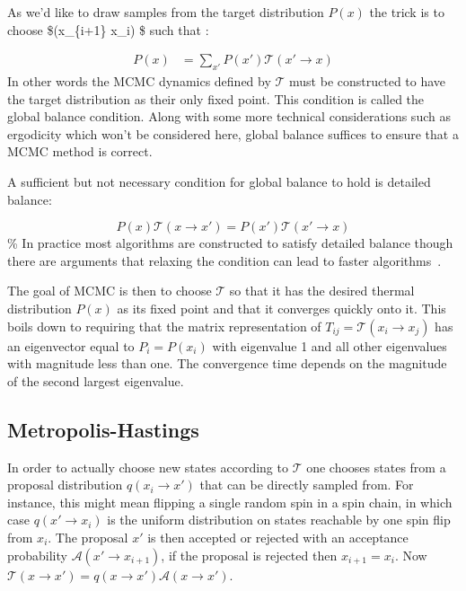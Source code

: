 As we'd like to draw samples from the target distribution \(P(x)\) the trick is to choose \$(x\_\{i+1\} \rightarrow x\_i) \$ such that :

\[\begin{aligned}
P(x) &= \sum_{x'} P(x') \mathcal{T}(x' \rightarrow x)
\end{aligned}
\] In other words the MCMC dynamics defined by \(\mathcal{T}\) must be constructed to have the target distribution as their only fixed point. This condition is called the global balance condition. Along with some more technical considerations such as ergodicity which won't be considered here, global balance suffices to ensure that a MCMC method is correct.

A sufficient but not necessary condition for global balance to hold is detailed balance:

\[
P(x) \mathcal{T}(x \rightarrow x') = P(x') \mathcal{T}(x' \rightarrow x)
\] \% In practice most algorithms are constructed to satisfy detailed balance though there are arguments that relaxing the condition can lead to faster algorithms~\autocite{kapferSamplingPolytopeHarddisk2013}.

The goal of MCMC is then to choose \(\mathcal{T}\) so that it has the desired thermal distribution \(P(x)\) as its fixed point and that it converges quickly onto it. This boils down to requiring that the matrix representation of \(T_{ij} = \mathcal{T}(x_i \to x_j)\) has an eigenvector equal to \(P_i = P(x_i)\) with eigenvalue 1 and all other eigenvalues with magnitude less than one. The convergence time depends on the magnitude of the second largest eigenvalue.

\hypertarget{metropolis-hastings}{%
\subsection{Metropolis-Hastings}\label{metropolis-hastings}}

In order to actually choose new states according to \(\mathcal{T}\) one chooses states from a proposal distribution \(q(x_i \to x')\) that can be directly sampled from. For instance, this might mean flipping a single random spin in a spin chain, in which case \(q(x'\to x_i)\) is the uniform distribution on states reachable by one spin flip from \(x_i\). The proposal \(x'\) is then accepted or rejected with an acceptance probability \(\mathcal{A}(x'\to x_{i+1})\), if the proposal is rejected then \(x_{i+1} = x_{i}\). Now \(\mathcal{T}(x\to x') = q(x\to x')\mathcal{A}(x \to x')\).

